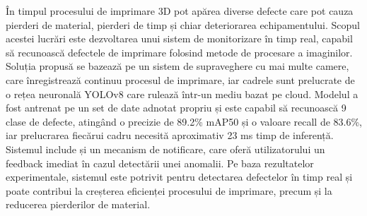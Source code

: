 În timpul procesului de imprimare 3D pot apărea diverse defecte care pot cauza pierderi de material, pierderi de timp și chiar deteriorarea echipamentului.
Scopul acestei lucrări este dezvoltarea unui sistem de monitorizare în timp real, capabil să recunoască defectele de imprimare folosind metode de procesare a imaginilor.
Soluția propusă se bazează pe un sistem de supraveghere cu mai multe camere, care înregistrează continuu procesul de imprimare, iar cadrele sunt
prelucrate de o rețea neuronală YOLOv8 care rulează într-un mediu bazat pe cloud. Modelul a fost antrenat pe un set de date adnotat propriu și este capabil
să recunoască 9 clase de defecte, atingând o precizie de 89.2\% mAP50 și o valoare recall de 83.6\%, iar prelucrarea fiecărui cadru necesită aproximativ 23 ms timp de inferență.
Sistemul include și un mecanism de notificare, care oferă utilizatorului un feedback imediat în cazul detectării unei anomalii.
Pe baza rezultatelor experimentale, sistemul este potrivit pentru detectarea defectelor în timp real și poate contribui la creșterea eficienței procesului de
imprimare, precum și la reducerea pierderilor de material.
